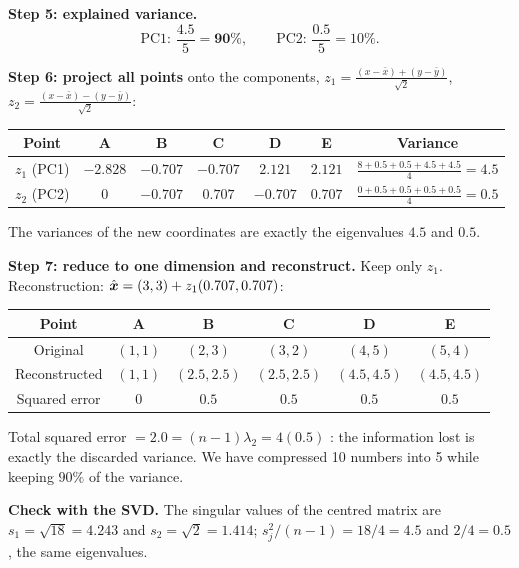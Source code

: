 \begin{example}
\medskip
\textbf{Step 5: explained variance.}
\[
  \text{PC1: }\frac{4.5}{5}=\mathbf{90\%},\qquad \text{PC2: }\frac{0.5}{5}=10\% .
\]

\textbf{Step 6: project all points} onto the components, $z_1=\frac{(x-\bar x)+(y-\bar y)}{\sqrt2}$, $z_2=\frac{(x-\bar x)-(y-\bar y)}{\sqrt2}$:
\begin{center}
\begin{tabular}{@{}c|ccccc|c@{}}
\toprule
Point & A & B & C & D & E & Variance\\
\midrule
$z_1$ (PC1) & $-2.828$ & $-0.707$ & $-0.707$ & $2.121$ & $2.121$ & $\frac{8+0.5+0.5+4.5+4.5}{4}=4.5$\\
$z_2$ (PC2) & $0$ & $-0.707$ & $0.707$ & $-0.707$ & $0.707$ & $\frac{0+0.5+0.5+0.5+0.5}{4}=0.5$\\
\bottomrule
\end{tabular}
\end{center}
The variances of the new coordinates are exactly the eigenvalues $4.5$ and $0.5$.

\medskip
\textbf{Step 7: reduce to one dimension and reconstruct.} Keep only $z_1$. Reconstruction: $\hat{\boldsymbol{x}}=(3,3)+z_1(0.707,0.707)$:
\begin{center}
\begin{tabular}{@{}c|ccccc@{}}
\toprule
Point & A & B & C & D & E\\
\midrule
Original & $(1,1)$ & $(2,3)$ & $(3,2)$ & $(4,5)$ & $(5,4)$\\
Reconstructed & $(1,1)$ & $(2.5,2.5)$ & $(2.5,2.5)$ & $(4.5,4.5)$ & $(4.5,4.5)$\\
Squared error & $0$ & $0.5$ & $0.5$ & $0.5$ & $0.5$\\
\bottomrule
\end{tabular}
\end{center}
Total squared error $=2.0=(n-1)\lambda_2=4(0.5)$ \checkmark: the information lost is exactly the discarded variance. We have compressed 10 numbers into 5 while keeping $90\%$ of the variance.

\medskip
\textbf{Check with the SVD.} The singular values of the centred matrix are $s_1=\sqrt{18}=4.243$ and $s_2=\sqrt2=1.414$; $s_j^2/(n-1)=18/4=4.5$ and $2/4=0.5$, the same eigenvalues.
\end{example}

